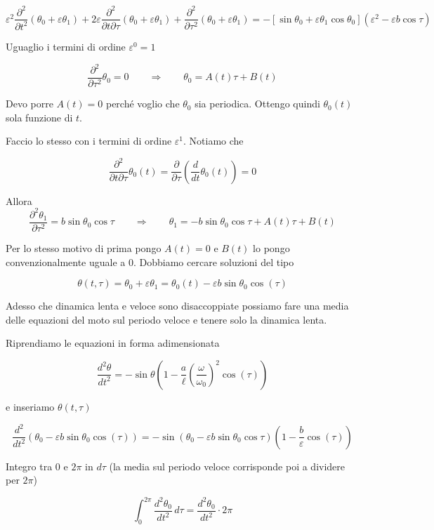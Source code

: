 \[
\varepsilon^2
\frac{\partial^2}{\partial t^2}(\theta_0+\varepsilon\theta_1)
+
2\varepsilon
\frac{\partial^2}{\partial t\partial\tau}
(\theta_0+\varepsilon\theta_1)
+
\frac{\partial^2}{\partial \tau^2}
(\theta_0+\varepsilon\theta_1)
=
-
\left[
\sin\theta_0
+
\varepsilon\theta_1\cos\theta_0
\right]
(\varepsilon^2-\varepsilon b\cos\tau)
\]

Uguaglio i termini di ordine $\varepsilon^0=1$

\[
\frac{\partial^2}{\partial \tau^2}\theta_0=0
\qquad \Rightarrow \qquad
\theta_0=A(t)\tau+B(t)
\]

Devo porre $A(t)=0$ perché voglio che $\theta_0$ sia periodica. Ottengo quindi $\theta_0(t)$ sola funzione di $t$.

Faccio lo stesso con i termini di ordine $\varepsilon^1$. Notiamo che

\[
\frac{\partial^2}{\partial t\partial\tau}\theta_0(t)
=
\frac{\partial}{\partial \tau}
\left(
\frac{d}{dt}\theta_0(t)
\right)
=
0
\]

Allora
\[
\frac{\partial^2 \theta_1}{\partial \tau^2}
=
b\sin\theta_0\cos\tau
\qquad \Rightarrow \qquad
\theta_1
=
-b\sin\theta_0\cos\tau
+
A(t)\tau
+
B(t)
\]

Per lo stesso motivo di prima pongo $A(t)=0$ e $B(t)$ lo pongo convenzionalmente uguale a $0$.
Dobbiamo cercare soluzioni del tipo

\[
\theta(t,\tau)
=
\theta_0
+
\varepsilon\theta_1
=
\theta_0(t)
-
\varepsilon b\sin\theta_0\cos(\tau)
\]

Adesso che dinamica lenta e veloce sono disaccoppiate possiamo fare una media delle equazioni del moto sul periodo veloce e tenere solo la dinamica lenta.

Riprendiamo le equazioni in forma adimensionata

\[
\frac{d^2\theta}{dt^2}
=
-\sin\theta
\left(
1-\frac{a}{\ell}
\left(
\frac{\omega}{\omega_0}
\right)^2
\cos(\tau)
\right)
\]

e inseriamo $\theta(t,\tau)$

\[
\frac{d^2}{dt^2}
\left(
\theta_0
-
\varepsilon b\sin\theta_0\cos(\tau)
\right)
=
-\sin
\left(
\theta_0
-
\varepsilon b\sin\theta_0\cos\tau
\right)
\left(
1-\frac{b}{\varepsilon}
\cos(\tau)
\right)
\]

Integro tra $0$ e $2\pi$ in $d\tau$ (la media sul periodo veloce corrisponde poi a dividere per $2\pi$)

\[
\int_0^{2\pi}
\frac{d^2\theta_0}{dt^2}
\,d\tau
=
\frac{d^2\theta_0}{dt^2}\cdot 2\pi
\]

